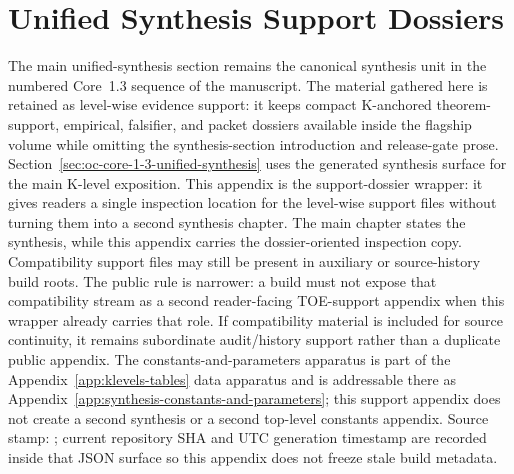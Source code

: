 \section{Unified Synthesis Support Dossiers}
\label{sec:oc-core-1-3-synthesis-support-dossiers}

The main unified-synthesis section remains the canonical synthesis unit in the
numbered Core~1.3 sequence of the manuscript.
The material gathered here is retained as level-wise evidence support: it keeps
compact K-anchored theorem-support, empirical, falsifier, and packet dossiers
available inside the flagship volume while omitting the synthesis-section
introduction and release-gate prose.
Section~\ref{sec:oc-core-1-3-unified-synthesis} uses the generated synthesis
surface for the main K-level exposition. This appendix is the support-dossier
wrapper: it gives readers a single inspection location for the level-wise
support files without turning them into a second synthesis chapter. The main
chapter states the synthesis, while this appendix carries the dossier-oriented
inspection copy. Compatibility support files may still be present in auxiliary
or source-history build roots. The public rule is narrower: a build must not
expose that compatibility stream as a second reader-facing TOE-support
appendix when this wrapper already carries that role. If compatibility material
is included for source continuity, it remains subordinate audit/history support
rather than a duplicate public appendix. The constants-and-parameters apparatus is part of the
Appendix~\ref{app:klevels-tables} data apparatus and is addressable there as
Appendix~\ref{app:synthesis-constants-and-parameters}; this support appendix
does not create a second synthesis or a second top-level constants appendix.
Source stamp:
;
current repository SHA and UTC generation timestamp are recorded inside that JSON
surface so this appendix does not freeze stale build metadata.


